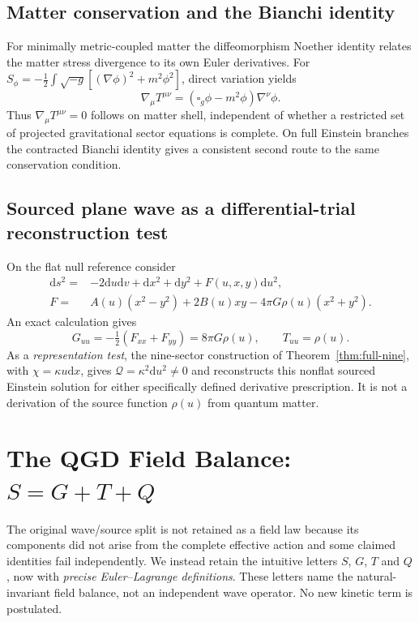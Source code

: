 \documentclass[11pt,a4paper]{article}
\newcommand{\dd}{\mathrm d}
\begin{document}
\subsection{Matter conservation and the Bianchi identity}
For minimally metric-coupled matter the diffeomorphism Noether identity
relates the matter stress divergence to its own Euler derivatives. For
$S_\phi=-\tfrac12\int\sqrt{-g}[(\nabla\phi)^2+m^2\phi^2]$, direct
variation yields
\begin{equation}\label{eq:qgd061-noether}
\boxed{\nabla_\mu T^{\mu\nu}=
(\square_g\phi-m^2\phi)\nabla^\nu\phi.}
\end{equation}
Thus $\nabla_\mu T^{\mu\nu}=0$ follows on matter shell, independent of
whether a restricted set of projected gravitational sector equations is
complete. On full Einstein branches the contracted Bianchi identity gives
a consistent second route to the same conservation condition.

\subsection{Sourced plane wave as a differential-trial reconstruction test}
On the flat null reference consider
\begin{equation}\label{eq:qgd061-sourced-wave}
\begin{split}
\dd s^2={}&-2\dd u\dd v+\dd x^2+\dd y^2+F(u,x,y)\dd u^2,\\
F={}&A(u)(x^2-y^2)+2B(u)xy
-4\pi G\rho(u)(x^2+y^2).
\end{split}
\end{equation}
An exact calculation gives
\begin{equation}\label{eq:qgd061-wave-source}
\boxed{G_{uu}=-\tfrac12(F_{xx}+F_{yy})=8\pi G\rho(u),
\qquad T_{uu}=\rho(u).}
\end{equation}
As a \emph{representation test}, the nine-sector construction of
Theorem~\ref{thm:full-nine}, with $\chi=\kappa u\dd x$, gives
$\mathcal Q=\kappa^2\dd u^2\ne0$ and reconstructs this nonflat sourced
Einstein solution for either specifically defined derivative prescription.
It is not a derivation of the source function $\rho(u)$ from quantum matter.


\section{The QGD Field Balance: \texorpdfstring{$S=G+T+Q$}{S=G+T+Q}}
\label{sec:qgd062-balance}
The original wave/source split is not retained as a field law because its
components did not arise from the complete effective action and some
claimed identities fail independently. We instead retain the intuitive
letters $S$, $G$, $T$ and $Q$, now with \emph{precise Euler--Lagrange
definitions}. These letters name the natural-invariant field balance,
not an independent wave operator. No new kinetic term is postulated.
\end{document}
